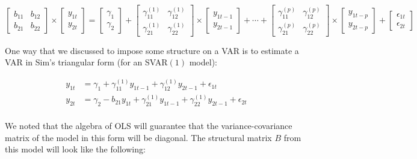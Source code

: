 \documentclass[11pt]{article}
\begin{document}
\vspace{3mm}
\begin{equation*}
\begin{bmatrix} b_{11} & b_{12} \\ b_{21} & b_{22} \end{bmatrix} \times 
\left[ \begin{array}{c} y_{1t} \\ y_{2t} \end{array} \right] = \left[\begin{array}{c} \gamma_{1} \\ \gamma_{2} \end{array}\right]
+ \begin{bmatrix} \gamma_{11}^{(1)} & \gamma_{12}^{(1)} \\ \gamma_{21}^{(1)} & \gamma_{22}^{(1)} \end{bmatrix} \times 
\left[\begin{array}{c} y_{1t-1} \\ y_{2t-1} \end{array} \right] + 
\cdots + 
\begin{bmatrix} \gamma_{11}^{(p)} & \gamma_{12}^{(p)} \\ \gamma_{21}^{(p)} & \gamma_{22}^{(p)} \end{bmatrix} \times
\left[\begin{array}{c} y_{1t-p} \\ y_{2t-p} \end{array} \right] +  
\left[\begin{array}{c} \epsilon_{1t} \\ \epsilon_{2t} \end{array} \right]
\end{equation*}


\newpage
One way that we discussed to impose some structure on a VAR is to estimate a VAR in Sim's triangular form
(for an SVAR$(1)$ model):

\vspace{3mm}
\begin{align*}
y_{1t} &= \gamma_{1} + \gamma_{11}^{(1)} y_{1t-1} + \gamma_{12}^{(1)} y_{2t-1} + \epsilon_{1t} \\
y_{2t} &= \gamma_{2} - b_{21} y_{1t} + \gamma_{21}^{(1)} y_{1t-1} + \gamma_{22}^{(1)} y_{2t-1} + \epsilon_{2t} \\
\end{align*}

\vspace{3.5mm}
We noted that the algebra of OLS will guarantee that the variance-covariance matrix of the model in this form
will be diagonal.  The structural matrix $B$ from this model will look like the following:
\end{document}
